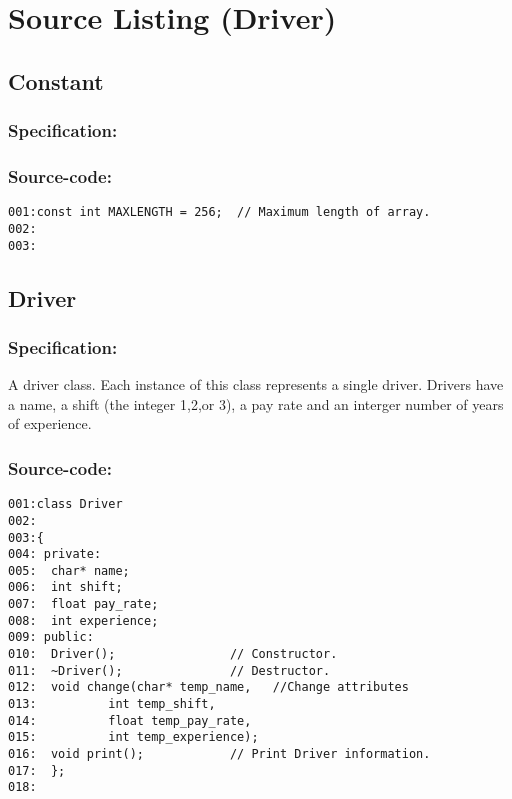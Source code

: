 
\chapter{Source Listing (Driver)}
\small

\section{Constant}
\subsection*{Specification:}

\subsection*{Source-code:}
\begin{verbatim}
001:const int MAXLENGTH = 256;  // Maximum length of array.
002:
003:
\end{verbatim}
\section{Driver}
\subsection*{Specification:}
A driver class. Each instance of this class represents a single
  driver. Drivers have a name, a shift (the integer 1,2,or 3),
  a pay rate and an interger number of years of experience.
\subsection*{Source-code:}
\begin{verbatim}
001:class Driver
002:
003:{
004: private:
005:  char* name;
006:  int shift;
007:  float pay_rate;
008:  int experience;
009: public:
010:  Driver();                // Constructor.
011:  ~Driver();               // Destructor.
012:  void change(char* temp_name,   //Change attributes
013:          int temp_shift, 
014:          float temp_pay_rate, 
015:          int temp_experience);
016:  void print();            // Print Driver information.
017:  };
018:
\end{verbatim}
